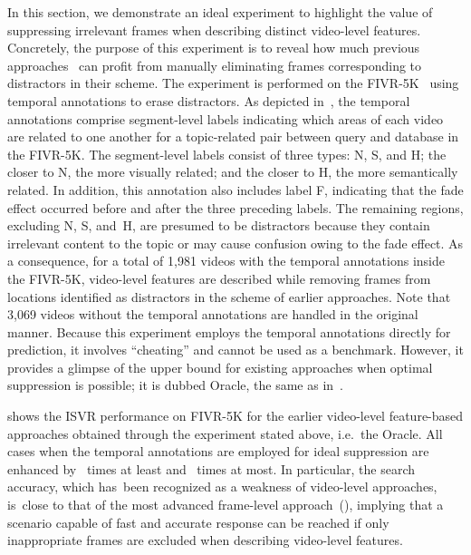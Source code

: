 \documentclass[10pt,twocolumn,letterpaper]{article}
\begin{document}
        In this section, we demonstrate an ideal experiment to highlight the value of suppressing irrelevant frames when describing distinct video-level features. Concretely, the purpose of this experiment is to reveal how much previous approaches~\cite{kordopatis2017near, shao2021temporal, ng2022vrag} can profit from manually eliminating frames corresponding to distractors in their scheme. The experiment is performed on the FIVR-5K~\cite{kordopatis2019fivr} using temporal annotations to erase distractors. As depicted in~, the temporal annotations comprise segment-level labels indicating which areas of each video are related to one another for a topic-related pair between query and database in the FIVR-5K. The segment-level labels consist of three types: N, S, and H; the closer to N, the more visually related; and the closer to H, the more semantically related. In addition, this annotation also includes label F, indicating that the fade effect occurred before and after the three preceding labels. The remaining regions, excluding N, S, and~H, are presumed to be distractors because they contain irrelevant content to the topic or may cause confusion owing to the fade effect. As a consequence, for a total of 1,981 videos with the temporal annotations inside the FIVR-5K, video-level features are described while removing frames from locations identified as distractors in the scheme of earlier approaches. Note that 3,069 videos without the temporal annotations are handled in the original manner. Because this experiment employs the temporal annotations directly for prediction, it involves ``cheating'' and cannot be used as a benchmark. However, it provides a glimpse of the upper bound for existing approaches when optimal suppression is possible; it is dubbed Oracle, the same as in~\cite{huang2018makes}.

         shows the ISVR performance on FIVR-5K for the earlier video-level feature-based approaches obtained through the experiment stated above, i.e.~the Oracle. All cases when the temporal annotations are employed for ideal suppression are enhanced by ~times at least and ~times at most. In particular, the search accuracy, which has~been recognized as a weakness of video-level approaches, is~close to that of the most advanced frame-level approach~(), implying that a scenario capable of fast and accurate response can be reached if only inappropriate frames are excluded when describing video-level features.
\end{document}
